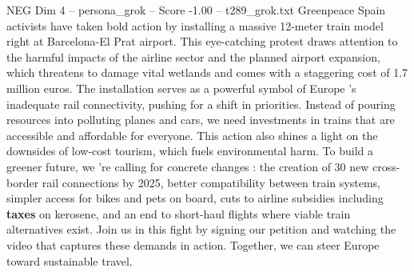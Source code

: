 \begin{textsample}{NEG Dim 4 – persona\_grok – Score -1.00 – t289\_grok.txt}  \label{ex:f4_neg_027}
Greenpeace Spain activists have taken bold action by installing a massive 12-meter train model right at Barcelona-El Prat airport.
This eye-catching protest draws attention to the harmful impacts of the airline sector and the planned airport expansion, which threatens to damage vital wetlands and comes with a staggering cost of 1.7 million euros.
The installation serves as a powerful symbol of Europe 's inadequate rail connectivity, pushing for a shift in priorities.
Instead of pouring resources into polluting planes and cars, we need investments in trains that are accessible and affordable for everyone.
This action also shines a light on the downsides of low-cost tourism, which fuels environmental harm.
To build a greener future, we 're calling for concrete changes : the creation of 30 new cross-border rail connections by 2025, better compatibility between train systems, simpler access for bikes and pets on board, cuts to airline subsidies including \textbf{taxes} on kerosene, and an end to short-haul flights where viable train alternatives exist.
Join us in this fight by signing our petition and watching the video that captures these demands in action.
Together, we can steer Europe toward sustainable travel.

\end{textsample}
